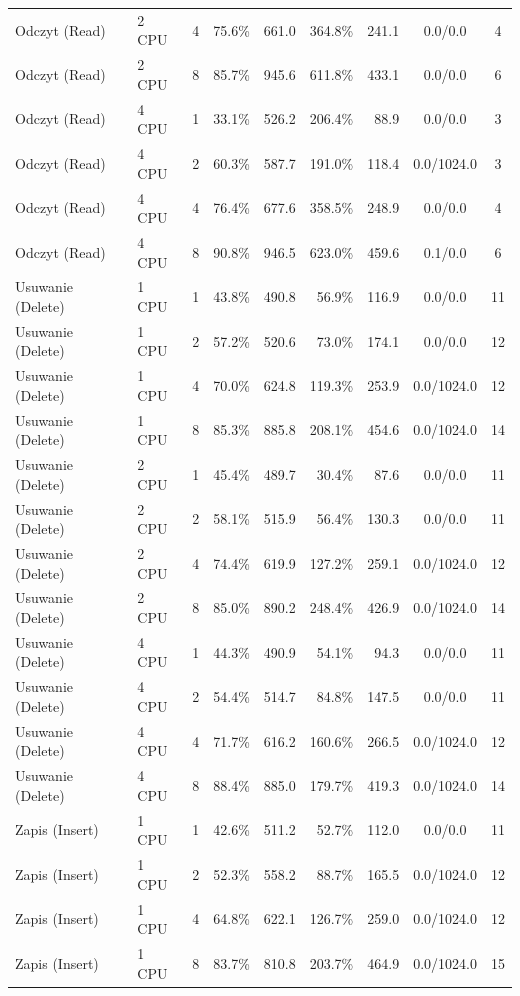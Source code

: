 \begin{table}[ht]
{\begin{tabular}{llcrrrrcc}
Odczyt (Read) & 2 CPU & 4 & 75.6\% & 661.0 & 364.8\% & 241.1 & 0.0/0.0 & 4 \\
Odczyt (Read) & 2 CPU & 8 & 85.7\% & 945.6 & 611.8\% & 433.1 & 0.0/0.0 & 6 \\
Odczyt (Read) & 4 CPU & 1 & 33.1\% & 526.2 & 206.4\% & 88.9 & 0.0/0.0 & 3 \\
Odczyt (Read) & 4 CPU & 2 & 60.3\% & 587.7 & 191.0\% & 118.4 & 0.0/1024.0 & 3 \\
Odczyt (Read) & 4 CPU & 4 & 76.4\% & 677.6 & 358.5\% & 248.9 & 0.0/0.0 & 4 \\
Odczyt (Read) & 4 CPU & 8 & 90.8\% & 946.5 & 623.0\% & 459.6 & 0.1/0.0 & 6 \\
Usuwanie (Delete) & 1 CPU & 1 & 43.8\% & 490.8 & 56.9\% & 116.9 & 0.0/0.0 & 11 \\
Usuwanie (Delete) & 1 CPU & 2 & 57.2\% & 520.6 & 73.0\% & 174.1 & 0.0/0.0 & 12 \\
Usuwanie (Delete) & 1 CPU & 4 & 70.0\% & 624.8 & 119.3\% & 253.9 & 0.0/1024.0 & 12 \\
Usuwanie (Delete) & 1 CPU & 8 & 85.3\% & 885.8 & 208.1\% & 454.6 & 0.0/1024.0 & 14 \\
Usuwanie (Delete) & 2 CPU & 1 & 45.4\% & 489.7 & 30.4\% & 87.6 & 0.0/0.0 & 11 \\
Usuwanie (Delete) & 2 CPU & 2 & 58.1\% & 515.9 & 56.4\% & 130.3 & 0.0/0.0 & 11 \\
Usuwanie (Delete) & 2 CPU & 4 & 74.4\% & 619.9 & 127.2\% & 259.1 & 0.0/1024.0 & 12 \\
Usuwanie (Delete) & 2 CPU & 8 & 85.0\% & 890.2 & 248.4\% & 426.9 & 0.0/1024.0 & 14 \\
Usuwanie (Delete) & 4 CPU & 1 & 44.3\% & 490.9 & 54.1\% & 94.3 & 0.0/0.0 & 11 \\
Usuwanie (Delete) & 4 CPU & 2 & 54.4\% & 514.7 & 84.8\% & 147.5 & 0.0/0.0 & 11 \\
Usuwanie (Delete) & 4 CPU & 4 & 71.7\% & 616.2 & 160.6\% & 266.5 & 0.0/1024.0 & 12 \\
Usuwanie (Delete) & 4 CPU & 8 & 88.4\% & 885.0 & 179.7\% & 419.3 & 0.0/1024.0 & 14 \\
Zapis (Insert) & 1 CPU & 1 & 42.6\% & 511.2 & 52.7\% & 112.0 & 0.0/0.0 & 11 \\
Zapis (Insert) & 1 CPU & 2 & 52.3\% & 558.2 & 88.7\% & 165.5 & 0.0/1024.0 & 12 \\
Zapis (Insert) & 1 CPU & 4 & 64.8\% & 622.1 & 126.7\% & 259.0 & 0.0/1024.0 & 12 \\
Zapis (Insert) & 1 CPU & 8 & 83.7\% & 810.8 & 203.7\% & 464.9 & 0.0/1024.0 & 15 \\

\end{tabular}}
\end{table}
